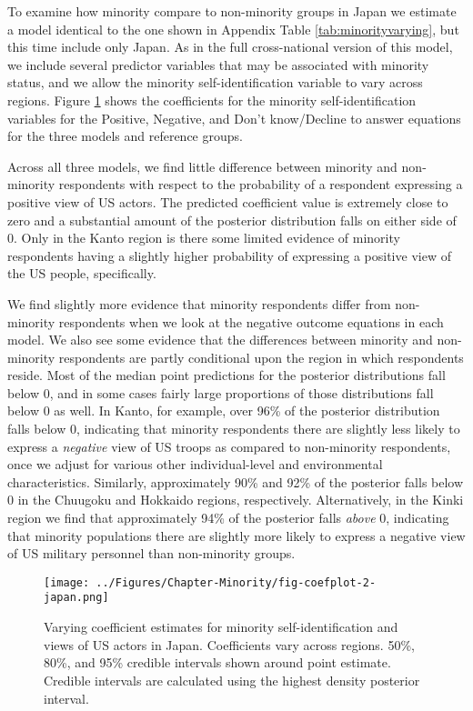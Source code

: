 To examine how minority compare to non-minority groups in Japan we estimate a model identical to the one shown in Appendix Table \ref{tab:minorityvarying}, but this time include only Japan. As in the full cross-national version of this model, we include several predictor variables that may be associated with minority status, and we allow the minority self-identification variable to vary across regions. Figure \ref{fig:coefplot-japan} shows the coefficients for the minority self-identification variables for the Positive, Negative, and Don't know/Decline to answer equations for the three models and reference groups.

Across all three models, we find little difference between minority and non-minority respondents with respect to the probability of a respondent expressing a positive view of US actors. The predicted coefficient value is extremely close to zero and a substantial amount of the posterior distribution falls on either side of 0. Only in the Kanto region is there some limited evidence of minority respondents having a slightly higher probability of expressing a positive view of the US people, specifically. 

We find slightly more evidence that minority respondents differ from non-minority respondents when we look at the negative outcome equations in each model. We also see some evidence that the differences between minority and non-minority respondents are partly conditional upon the region in which respondents reside. Most of the median point predictions for the posterior distributions fall below 0, and in some cases fairly large proportions of those distributions fall below 0 as well. In Kanto, for example, over 96\% of the posterior distribution falls below 0, indicating that minority respondents there are slightly less likely to express a \textit{negative} view of US troops as compared to non-minority respondents, once we adjust for various other individual-level and environmental characteristics. Similarly, approximately 90\% and 92\% of the posterior falls below 0 in the Chuugoku and Hokkaido regions, respectively. Alternatively, in the Kinki region we find that approximately 94\% of the posterior falls \textit{above} 0, indicating that minority populations there are slightly more likely to express a negative view of US military personnel than non-minority groups.


\begin{figure}[t]
	\centering\texttt{[image: ../Figures/Chapter-Minority/fig-coefplot-2-japan.png]}
	\caption{Varying coefficient estimates for minority self-identification and views of US actors in Japan. Coefficients vary across regions. 50\%, 80\%, and 95\% credible intervals shown around point estimate. Credible intervals are calculated using the highest density posterior interval.}
	\label{fig:coefplot-japan}
\end{figure}

